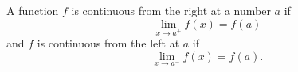 \begin{frame}
\begin{definition}
A function $f$ is continuous from the right at a number $a$ if
\[
\lim_{x\rightarrow a^+} f(x) = f(a)
\]
and $f$ is continuous from the left at $a$ if
\[
\lim_{x\rightarrow a^-} f(x) = f(a).
\]
\end{definition}
\end{frame}
